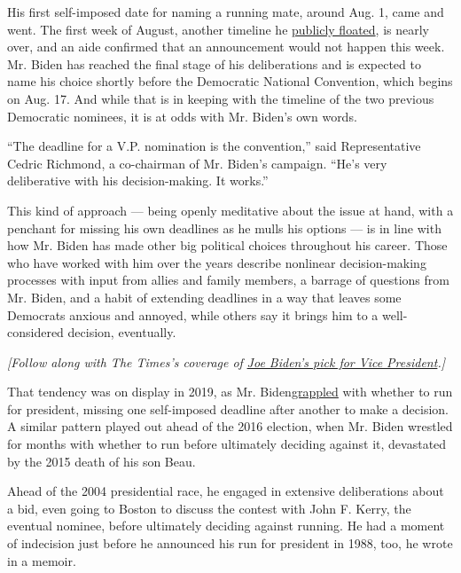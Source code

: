 His first self-imposed date for naming a running mate, around Aug. 1,
came and went. The first week of August, another timeline he
\href{https://www.nytimes3xbfgragh.onion/2020/07/28/us/politics/joe-biden-racial-justice-economy-plan.html}{publicly
floated}, is nearly over, and an aide confirmed that an announcement
would not happen this week. Mr. Biden has reached the final stage of his
deliberations and is expected to name his choice shortly before the
Democratic National Convention, which begins on Aug. 17. And while that
is in keeping with the timeline of the two previous Democratic nominees,
it is at odds with Mr. Biden's own words.

``The deadline for a V.P. nomination is the convention,'' said
Representative Cedric Richmond, a co-chairman of Mr. Biden's campaign.
``He's very deliberative with his decision-making. It works.''

This kind of approach --- being openly meditative about the issue at
hand, with a penchant for missing his own deadlines as he mulls his
options --- is in line with how Mr. Biden has made other big political
choices throughout his career. Those who have worked with him over the
years describe nonlinear decision-making processes with input from
allies and family members, a barrage of questions from Mr. Biden, and a
habit of extending deadlines in a way that leaves some Democrats anxious
and annoyed, while others say it brings him to a well-considered
decision, eventually.

\emph{{[}Follow along with The Times's coverage of}
\href{https://www.nytimes3xbfgragh.onion/news-event/biden-vice-president}{\emph{Joe
Biden's pick for Vice President}}\emph{.{]}}

That tendency was on display in 2019, as Mr.
Biden\href{https://www.nytimes3xbfgragh.onion/2019/03/07/us/politics/biden-2020.html}{grappled}
with whether to run for president, missing one self-imposed deadline
after another to make a decision. A similar pattern played out ahead of
the 2016 election, when Mr. Biden wrestled for months with whether to
run before ultimately deciding against it, devastated by the 2015 death
of his son Beau.

Ahead of the 2004 presidential race, he engaged in extensive
deliberations about a bid, even going to Boston to discuss the contest
with John F. Kerry, the eventual nominee, before ultimately deciding
against running. He had a moment of indecision just before he announced
his run for president in 1988, too, he wrote in a memoir.

